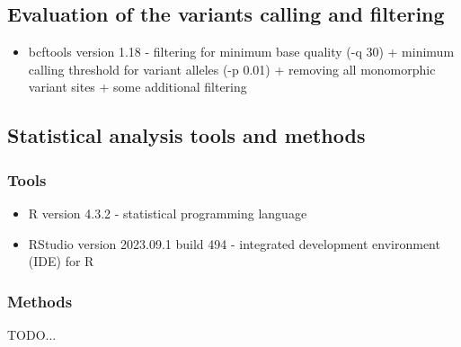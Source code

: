 \subsection{Evaluation of the variants calling and filtering}

\begin{itemize}
    \item bcftools version 1.18 - filtering for minimum base quality (-q 30) + minimum calling threshold for variant alleles (-p 0.01) + removing all monomorphic variant sites + some additional filtering
\end{itemize}

\subsection{Statistical analysis tools and methods}

\subsubsection{Tools}

\begin{itemize}
    \item R version 4.3.2 - statistical programming language
    \item RStudio version 2023.09.1 build 494 - integrated development environment (IDE) for R
\end{itemize}

\subsubsection{Methods}

TODO...